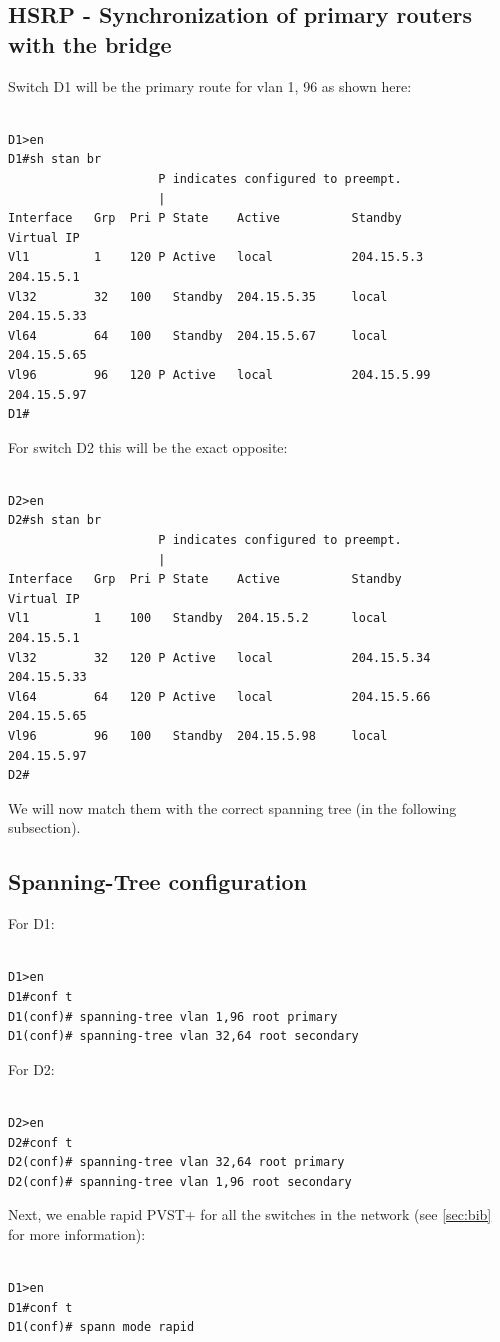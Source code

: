 \documentclass[ a4, 12pt, onecolumn]{IEEEtran}
\begin{document}
\subsection{HSRP - Synchronization of primary routers with the bridge}
Switch D1 will be the primary route for vlan 1, 96 as shown here:
\begin{center}
\begin{lstlisting}

D1>en
D1#sh stan br
                     P indicates configured to preempt.
                     |
Interface   Grp  Pri P State    Active          Standby         Virtual IP
Vl1         1    120 P Active   local           204.15.5.3      204.15.5.1     
Vl32        32   100   Standby  204.15.5.35     local           204.15.5.33    
Vl64        64   100   Standby  204.15.5.67     local           204.15.5.65    
Vl96        96   120 P Active   local           204.15.5.99     204.15.5.97    
D1#
\end{lstlisting}
\end{center}
For switch D2 this will be the exact opposite:
\begin{center}
\begin{lstlisting}

D2>en
D2#sh stan br
                     P indicates configured to preempt.
                     |
Interface   Grp  Pri P State    Active          Standby         Virtual IP
Vl1         1    100   Standby  204.15.5.2      local           204.15.5.1     
Vl32        32   120 P Active   local           204.15.5.34     204.15.5.33    
Vl64        64   120 P Active   local           204.15.5.66     204.15.5.65    
Vl96        96   100   Standby  204.15.5.98     local           204.15.5.97    
D2#
\end{lstlisting}
\end{center}
We will now match them with the correct spanning tree (in the following subsection).
\subsection{Spanning-Tree configuration}
For D1:
\begin{center}
\begin{lstlisting}

D1>en    
D1#conf t
D1(conf)# spanning-tree vlan 1,96 root primary
D1(conf)# spanning-tree vlan 32,64 root secondary
\end{lstlisting}
\end{center}
For D2:
\begin{center}
\begin{lstlisting}

D2>en    
D2#conf t
D2(conf)# spanning-tree vlan 32,64 root primary
D2(conf)# spanning-tree vlan 1,96 root secondary
\end{lstlisting}
\end{center}
Next, we enable rapid PVST+ for all the switches in the network (see \ref{sec:bib} for more information):
\begin{center}
\begin{lstlisting}

D1>en    
D1#conf t
D1(conf)# spann mode rapid
\end{lstlisting}
\end{center}
\end{document}
